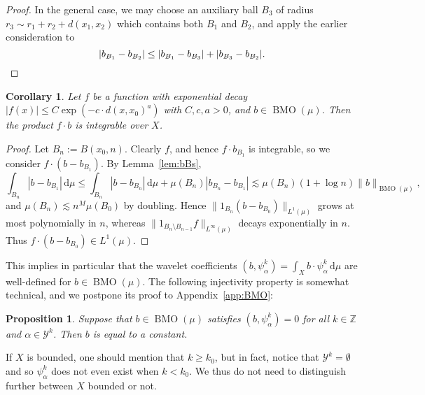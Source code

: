 \documentclass{amsart}
\numberwithin{equation}{section}
\theoremstyle{plain}
\newtheorem{proposition}[equation]{Proposition}
\newtheorem{corollary}[equation]{Corollary}
\theoremstyle{definition}
\theoremstyle{remark}
\begin{document}
{{{\begin{proof}
In the general case, we may choose an auxiliary ball $B_3$ of radius $r_3\sim r_1+r_2+d(x_1,x_2)$ which contains both $B_1$ and $B_2$, and apply the earlier consideration to
\begin{equation*}
  {|{b_{B_1}-b_{B_2}}|}\leq{|{b_{B_1}-b_{B_3}}|}+{|{b_{B_3}-b_{B_2}}|}.\qedhere
\end{equation*}
\end{proof}

\begin{corollary}
Let $f$ be a function with exponential decay ${|{f(x)}|}\leq C\exp(-c\cdot d(x,x_0)^a)$ with $C,c,a>0$, and $b\in{\operatorname{BMO}}(\mu)$. Then the product $f\cdot b$ is integrable over $X$.
\end{corollary}

\begin{proof}
Let $B_n:=B(x_0,n)$. Clearly $f$, and hence $f\cdot b_{B_1}$ is integrable, so we consider $f\cdot(b-b_{B_1})$. By Lemma~\ref{lem:bBs},
\begin{equation*}
  \int_{B_n}{|{b-b_{B_1}}|}{\,\mathrm{d}}\mu
  \leq\int_{B_n}{|{b-b_{B_n}}|}{\,\mathrm{d}}\mu+\mu(B_n){|{b_{B_n}-b_{B_1}}|}
  \lesssim\mu(B_n)(1+\log n){\|{b}\|_{{{\operatorname{BMO}}(\mu)}}},
\end{equation*}
and $\mu(B_n)\lesssim n^M\mu(B_0)$ by doubling. Hence ${\|{1_{B_n}(b-b_{B_0})}\|_{{L^1(\mu)}}}$ grows at most polynomially in $n$, whereas ${\|{1_{B_n\setminus B_{n-1}}f}\|_{{L^{\infty}(\mu)}}}$ decays exponentially in $n$. Thus $f\cdot(b-b_{B_0})\in L^1(\mu)$.
\end{proof}

This implies in particular that the wavelet coefficients $(b,\psi^k_\alpha)=\int_X b\cdot\psi^k_\alpha{\,\mathrm{d}}\mu$ are well-defined for $b\in{\operatorname{BMO}}(\mu)$. The following injectivity property is somewhat technical, and we postpone its proof to Appendix~\ref{app:BMO}:

\begin{proposition}\label{prop:uniquenessBMO}
Suppose that $b\in{\operatorname{BMO}}(\mu)$ satisfies $(b,\psi^k_\alpha)=0$ for all $k\in{\mathbb{Z}}$ and $\alpha\in\mathscr{Y}^k$. Then $b$ is equal to a constant.
\end{proposition}

If $X$ is bounded, one should mention that $k\ge k_{0}$, but in fact, notice that $\mathscr{Y}^k=\emptyset$ and so $\psi^k_{\alpha}$ does not even exist  when $k<k_{0}$. We thus do not need to distinguish further between $X$ bounded or not.

}}}
\end{document}
